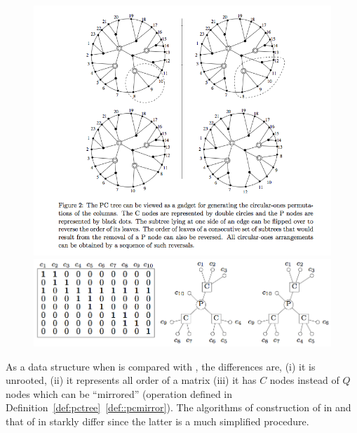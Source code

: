 \begin{figure}[htbp]
  \centering
  \includegraphics[scale=0.4]{../img/pctree_hm03.png}

  \centering
  \includegraphics[scale=0.4]{../img/pctree_dom.png}
  \caption{\figtabsize \PCtree {}}
  \label{fig:pctree}
\end{figure}

As a data structure when \PCtree is compared with \PQtree, the
differences are, (i) it is unrooted, (ii) it represents all \CROP order of a
matrix (iii) it has $C$ nodes instead of $Q$ nodes which can be
``mirrored'' (operation defined in Definition~\ref{def:pctree}~\ref{def::pcmirror}).
The algorithms of construction of \PQtree in \cite{bl76} and that of
\PCtree in \cite{wlh01, hm03} starkly differ since the latter is a
much simplified procedure.






